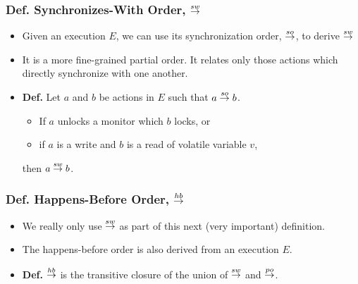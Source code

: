 \begin{frame}
    \frametitle{\textbf{Def.} Synchronizes-With Order, $\overset{sw}{\rightarrow}$}

    \begin{itemize}
        \item Given an execution $E$, we can use its synchronization order,
              $\overset{so}{\rightarrow}$, to derive $\overset{sw}{\rightarrow}$
    
        \item It is a more fine-grained partial order. It relates only those
              actions which directly synchronize with one another.

        \item \textbf{Def.} Let $a$ and $b$ be actions in $E$ such that
              $a \overset{so}{\rightarrow} b$.
              \begin{itemize}[itemsep=0.3em,topsep=0.5em]
                  \item If $a$ unlocks a monitor which $b$ locks, or
                  \item if $a$ is a write and $b$ is a read of volatile variable
                        $v$,
              \end{itemize}
        then $a \overset{sw}{\rightarrow} b$.
    \end{itemize}
\end{frame}

\begin{frame}
    \frametitle{\textbf{Def.} Happens-Before Order, $\overset{hb}{\rightarrow}$}

    \begin{itemize}
        \item We really only use $\overset{sw}{\rightarrow}$ as part of this next (very
              important) definition.

        \item The happens-before order is also derived from an execution $E$.

        \item \textbf{Def.} $\overset{hb}{\rightarrow}$ is the transitive closure of the union of
              $\overset{sw}{\rightarrow}$ and $\overset{po}{\rightarrow}$.
    \end{itemize}
\end{frame}

